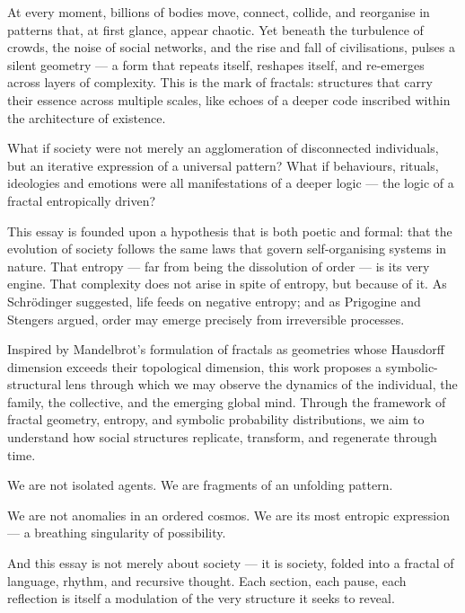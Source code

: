 At every moment, billions of bodies move, connect, collide, and reorganise in patterns that, at first glance, appear chaotic. Yet beneath the turbulence of crowds, the noise of social networks, and the rise and fall of civilisations, pulses a silent geometry — a form that repeats itself, reshapes itself, and re-emerges across layers of complexity. This is the mark of fractals: structures that carry their essence across multiple scales, like echoes of a deeper code inscribed within the architecture of existence.

What if society were not merely an agglomeration of disconnected individuals, but an iterative expression of a universal pattern? What if behaviours, rituals, ideologies and emotions were all manifestations of a deeper logic — the logic of a fractal entropically driven?

This essay is founded upon a hypothesis that is both poetic and formal: that the evolution of society follows the same laws that govern self-organising systems in nature. That entropy — far from being the dissolution of order — is its very engine. That complexity does not arise in spite of entropy, but because of it. As Schrödinger suggested, life feeds on negative entropy\cite{schrodinger1944}; and as Prigogine and Stengers argued, order may emerge precisely from irreversible processes\cite{prigogine1984}.

Inspired by Mandelbrot’s formulation of fractals as geometries whose Hausdorff dimension exceeds their topological dimension\cite{mandelbrot1982}, this work proposes a symbolic-structural lens through which we may observe the dynamics of the individual, the family, the collective, and the emerging global mind. Through the framework of fractal geometry, entropy, and symbolic probability distributions, we aim to understand how social structures replicate, transform, and regenerate through time.

We are not isolated agents. We are fragments of an unfolding pattern.

We are not anomalies in an ordered cosmos. We are its most entropic expression — a breathing singularity of possibility.

And this essay is not merely about society — it is society, folded into a fractal of language, rhythm, and recursive thought. Each section, each pause, each reflection is itself a modulation of the very structure it seeks to reveal.